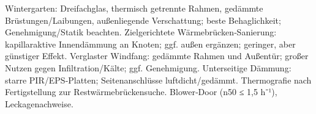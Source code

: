\markdownRendererInterblockSeparator
{}\markdownRendererUlBeginTight
\markdownRendererUlItem Wintergarten: Dreifachglas, thermisch getrennte Rahmen, gedämmte Brüstungen/Laibungen, außenliegende Verschattung; beste Behaglichkeit; Genehmigung/Statik beachten.\markdownRendererUlItemEnd 
\markdownRendererUlItem Zielgerichtete Wärmebrücken‑Sanierung: kapillaraktive Innendämmung an Knoten; ggf. außen ergänzen; geringer, aber günstiger Effekt.\markdownRendererUlItemEnd 
\markdownRendererUlEndTight \markdownRendererInterblockSeparator
{}
\markdownRendererSectionEnd \markdownRendererSectionBegin
{}\markdownRendererInterblockSeparator
{}\markdownRendererUlBeginTight
\markdownRendererUlItem Verglaster Windfang: gedämmte Rahmen und Außentür; großer Nutzen gegen Infiltration/Kälte; ggf. Genehmigung.\markdownRendererUlItemEnd 
\markdownRendererUlItem Unterseitige Dämmung: starre PIR/EPS‑Platten; Seitenanschlüsse luftdicht/gedämmt.\markdownRendererUlItemEnd 
\markdownRendererUlEndTight \markdownRendererInterblockSeparator
{}
\markdownRendererSectionEnd \markdownRendererSectionBegin
{}\markdownRendererInterblockSeparator
{}\markdownRendererUlBeginTight
\markdownRendererUlItem Thermografie nach Fertigstellung zur Restwärmebrückensuche.\markdownRendererUlItemEnd 
\markdownRendererUlItem Blower‑Door (n50 ≤ 1,5 h⁻¹), Leckagenachweise.\markdownRendererUlItemEnd 
\markdownRendererUlEndTight 
\markdownRendererSectionEnd 
\markdownRendererSectionEnd \markdownRendererDocumentEnd